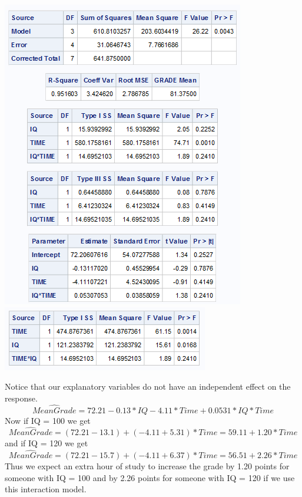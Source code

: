 \begin{flushleft}
\includegraphics[scale=0.9]{Testoutput}\\
\includegraphics[scale=0.9]{Testoutput2}
\end{flushleft}

\newpage

Notice that our explanatory variables do not have an independent effect on the response.
$$ \widehat{Mean Grade} = 72.21 - 0.13*IQ - 4.11*Time + 0.0531*IQ*Time$$ 
Now if IQ = 100 we get
$$ \widehat{Mean Grade} = (72.21 - 13.1) + (- 4.11 + 5.31)*Time= 59.11+1.20*Time $$
and if IQ = 120 we get
$$ \widehat{Mean Grade} = (72.21 - 15.7) + (- 4.11 + 6.37)*Time =56.51+2.26*Time$$
Thus we expect an extra hour of study to increase the grade by 1.20 points for someone with IQ = 100 and by 2.26 points for someone with IQ = 120 if we use this interaction model.\\~\\


